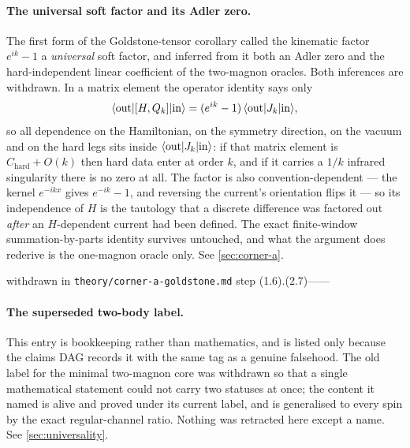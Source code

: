 \paragraph{The universal soft factor and its Adler zero.} \statusRefuted{}
The first form of the Goldstone-tensor corollary called the kinematic factor
$e^{ik}-1$ a \emph{universal} soft factor, and inferred from it both an Adler
zero and the hard-independent linear coefficient of the two-magnon oracles.
Both inferences are withdrawn. In a matrix element the operator identity says
only
\begin{equation}
  \langle \mathrm{out}|[H,Q_k]|\mathrm{in}\rangle
  = (e^{ik}-1)\,\langle \mathrm{out}|J_k|\mathrm{in}\rangle,
\end{equation}
so all dependence on the Hamiltonian, on the symmetry direction, on the vacuum
and on the hard legs sits inside $\langle \mathrm{out}|J_k|\mathrm{in}\rangle$: if
that matrix element is $C_{\mathrm{hard}} + O(k)$ then hard data enter at
order $k$, and if it carries a $1/k$ infrared singularity there is no zero at
all. The factor is also convention-dependent — the kernel $e^{-ikx}$ gives
$e^{-ik}-1$, and reversing the current's orientation flips it — so its
independence of $H$ is the tautology that a discrete difference was factored
out \emph{after} an $H$-dependent current had been defined. The exact
finite-window summation-by-parts identity survives untouched, and what the
argument does rederive is the one-magnon oracle only. See
\cref{sec:corner-a}.

%
{withdrawn in \texttt{theory/corner-a-goldstone.md} step (1.6).(2.7)}{---}{---}

\paragraph{The superseded two-body label.} \statusRefuted{} This entry is
bookkeeping rather than mathematics, and is listed only because the claims DAG
records it with the same tag as a genuine falsehood. The old label for the
minimal two-magnon core was withdrawn so that a single mathematical statement
could not carry two statuses at once; the content it named is alive and proved
under its current label, and is generalised to every spin by the exact
regular-channel ratio. Nothing was retracted here except a name. See
\cref{sec:universality}.


